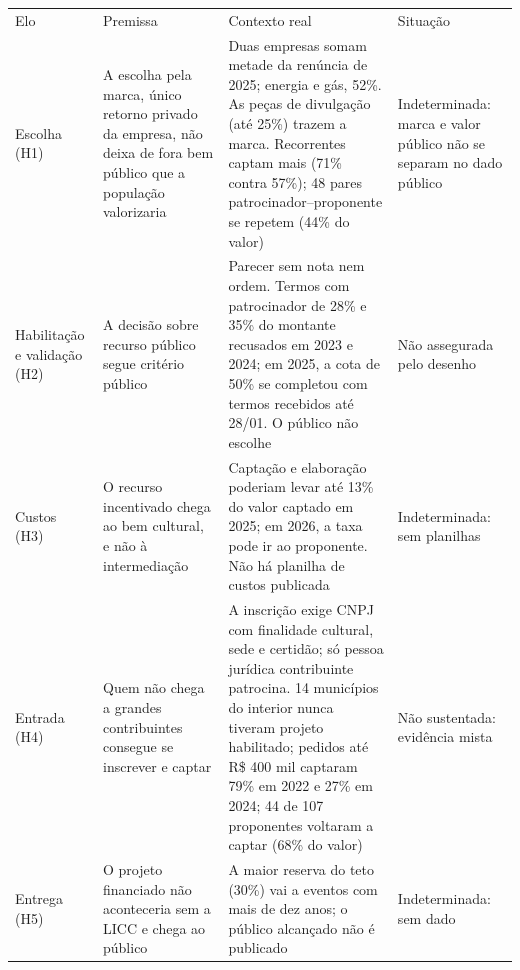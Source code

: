 \documentclass[12pt,a4paper]{article}
\begin{document}
\begin{table}[!htbp]
\label{quadro-2}
\footnotesize\renewcommand{\arraystretch}{1.15}
\begin{tabular}{@{}>{\raggedright\arraybackslash}p{}>{\raggedright\arraybackslash}p{}>{\raggedright\arraybackslash}p{}>{\raggedright\arraybackslash}p{}@{}}
\multicolumn{4}{@{}p{\linewidth}@{}}{\normalsize\raggedright \textbf{Quadro 2} -- Premissas da teoria da mudança} \\[4pt]
\toprule
Elo & Premissa & Contexto real & Situação \\
\midrule
Escolha (H1) & A escolha pela marca, único retorno privado da empresa, não deixa de fora bem público que a população valorizaria & Duas empresas somam metade da renúncia de 2025; energia e gás, 52\%. As peças de divulgação (até 25\%) trazem a marca. Recorrentes captam mais (71\% contra 57\%); 48 pares patrocinador--proponente se repetem (44\% do valor) & Indeterminada: marca e valor público não se separam no dado público \\ \addlinespace[3pt]
Habilitação e validação (H2) & A decisão sobre recurso público segue critério público & Parecer sem nota nem ordem. Termos com patrocinador de 28\% e 35\% do montante recusados em 2023 e 2024; em 2025, a cota de 50\% se completou com termos recebidos até 28/01. O público não escolhe & Não assegurada pelo desenho \\ \addlinespace[3pt]
Custos (H3) & O recurso incentivado chega ao bem cultural, e não à intermediação & Captação e elaboração poderiam levar até 13\% do valor captado em 2025; em 2026, a taxa pode ir ao proponente. Não há planilha de custos publicada & Indeterminada: sem planilhas \\ \addlinespace[3pt]
Entrada (H4) & Quem não chega a grandes contribuintes consegue se inscrever e captar & A inscrição exige CNPJ com finalidade cultural, sede e certidão; só pessoa jurídica contribuinte patrocina. 14 municípios do interior nunca tiveram projeto habilitado; pedidos até R\$ 400 mil captaram 79\% em 2022 e 27\% em 2024; 44 de 107 proponentes voltaram a captar (68\% do valor) & Não sustentada: evidência mista \\ \addlinespace[3pt]
Entrega (H5) & O projeto financiado não aconteceria sem a LICC e chega ao público & A maior reserva do teto (30\%) vai a eventos com mais de dez anos; o público alcançado não é publicado & Indeterminada: sem dado \\

\end{tabular}
\end{table}
\end{document}
